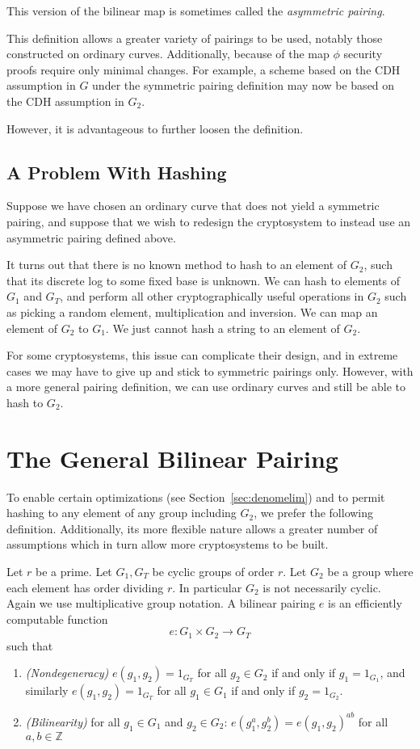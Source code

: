 This version of the bilinear map is sometimes called
the \emph{asymmetric pairing}.

This definition allows a greater variety of pairings to be used,
notably those constructed on ordinary curves.
Additionally, because of the map $\phi$ security proofs
require only minimal changes. For example,
a scheme based on the CDH assumption in $G$ under
the symmetric pairing definition may now be based on the CDH assumption in
$G_2$.

However, it is advantageous to further loosen the
definition.

\subsection{A Problem With Hashing}

Suppose we have chosen an ordinary curve that does not yield a symmetric
pairing, and suppose that we wish to redesign
the cryptosystem to instead use an asymmetric pairing defined above.

It turns out that there is no
known method to hash to an element of $G_2$, such that
its discrete log to some fixed base is unknown. We can hash to elements of
$G_1$ and $G_T$, and perform all other cryptographically useful
operations in $G_2$ such as picking a random element, multiplication
and inversion. We can map an element of $G_2$ to $G_1$.
We just cannot hash a string to an element of $G_2$.

For some cryptosystems, this issue can complicate their design,
and in extreme cases we may have to give up and stick to symmetric pairings
only.
However, with a more general pairing definition, we can use ordinary curves
and still be able to hash to $G_2$.

\section{\label{sec:generalpairing}The General Bilinear Pairing}

To enable certain optimizations (see Section~\ref{sec:denomelim}) and
to permit hashing to any element of any group including $G_2$,
we prefer the following definition. Additionally, its more flexible nature
allows a greater number of assumptions which in turn allow more
cryptosystems to be built.

Let $r$ be a prime.
Let $G_1, G_T$ be cyclic groups of order $r$.
Let $G_2$ be a group where each element has order dividing $r$.
In particular $G_2$ is not necessarily cyclic.
Again we use multiplicative group notation.
A bilinear pairing $e$ is an efficiently computable function
\[
e:G_1 \times G_2 \rightarrow G_T
\]
such that
\begin{enumerate}
\item
\emph{(Nondegeneracy)}
$e(g_1,g_2) = 1_{G_T}$ for all $g_2 \in G_2$ if and only if $g_1 = 1_{G_1}$,
and similarly 
$e(g_1,g_2) = 1_{G_T}$ for all $g_1 \in G_1$ if and only if $g_2 = 1_{G_2}$.
\item
\emph{(Bilinearity)}
for all $g_1 \in G_1$ and $g_2 \in G_2$:
$e(g_1^a, g_2^b) = e(g_1,g_2)^{a b}$ for all $a, b \in \mathbb{Z}$
\end{enumerate}

